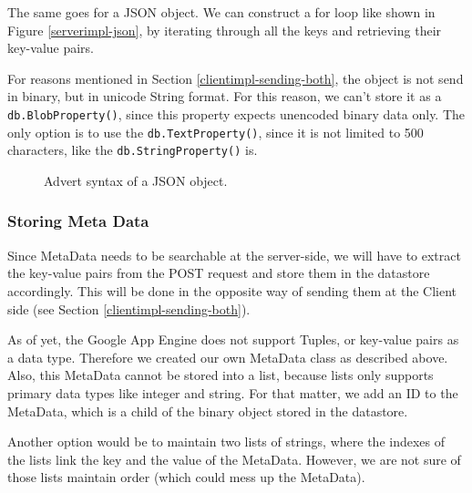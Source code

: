 The same goes for a JSON object. We can construct a for loop like shown in
Figure \ref{serverimpl-json}, by iterating through all the keys and retrieving
their key-value pairs.

For reasons mentioned in Section \ref{clientimpl-sending-both}, the object is
not send in binary, but in unicode String format. For this reason, we can't
store it as a \texttt{db.BlobProperty()}, since this property expects unencoded
binary data only. The only option is to use the \texttt{db.TextProperty()},
since it is not limited to 500 characters, like the \texttt{db.StringProperty()}
is.


\begin{figure*}[ht] %
\begin{center}
\begin{code}
\end{code}
\caption{Advert syntax of a JSON object.\label{serverimpl-json-syntax}}
\end{center}
\end{figure*}

\subsubsection{Storing Meta Data}
Since MetaData needs to be searchable at the server-side, we will have to extract
the key-value pairs from the POST request and store them in the datastore
accordingly. This will be done in the opposite way of sending them at the Client
side (see Section \ref{clientimpl-sending-both}).

As of yet, the Google App Engine does not support Tuples, or key-value pairs as a
data type. Therefore we created our own MetaData class as described above. Also,
this MetaData cannot be stored into a list, because lists only supports primary
data types like integer and string. For that matter, we add an ID to the
MetaData, which is a child of the binary object stored in the datastore.

Another option would be to maintain two lists of strings, where the indexes of
the lists link the key and the value of the MetaData. However, we are not sure of
those lists maintain order (which could mess up the MetaData).

